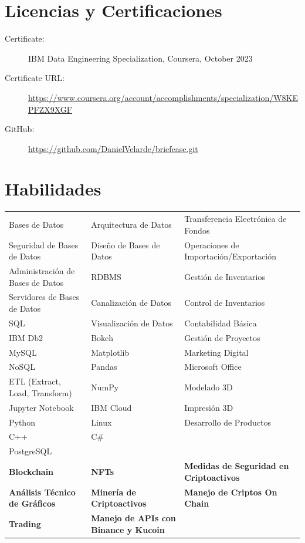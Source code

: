 \documentclass[a4paper,10pt]{article}
\begin{document}
\section*{Licencias y Certificaciones}

\begin{description}
    \item[Certificate:] IBM Data Engineering Specialization, Coursera, October 2023
    \item[Certificate URL:] \url{https://www.coursera.org/account/accomplishments/specialization/W8KEPFZX9XGF}
\end{description}

\vspace{1pt} %

\begin{description}
    \item[GitHub:] \url{https://github.com/DanielVelarde/briefcase.git}
\end{description}

\section*{Habilidades}
\begin{tabular}{p{4.5cm}p{4.5cm}p{4.5cm}}
    Bases de Datos & Arquitectura de Datos & Transferencia Electrónica de Fondos \\
    Seguridad de Bases de Datos & Diseño de Bases de Datos & Operaciones de Importación/Exportación \\
    Administración de Bases de Datos & RDBMS & Gestión de Inventarios \\
    Servidores de Bases de Datos & Canalización de Datos & Control de Inventarios \\
    SQL & Visualización de Datos & Contabilidad Básica \\
    IBM Db2 & Bokeh & Gestión de Proyectos \\
    MySQL & Matplotlib & Marketing Digital \\
    NoSQL & Pandas & Microsoft Office \\
    ETL (Extract, Load, Transform) & NumPy & Modelado 3D \\
    Jupyter Notebook & IBM Cloud & Impresión 3D \\
    Python & Linux & Desarrollo de Productos \\
    C++ & C\# & \\
    PostgreSQL & & \\
    \textbf{Blockchain} & \textbf{NFTs} & \textbf{Medidas de Seguridad en Criptoactivos} \\
    \textbf{Análisis Técnico de Gráficos} & \textbf{Minería de Criptoactivos} & \textbf{Manejo de Criptos On Chain} \\
    \textbf{Trading} & \textbf{Manejo de APIs con Binance y Kucoin} & \\
\end{tabular}
\end{document}
